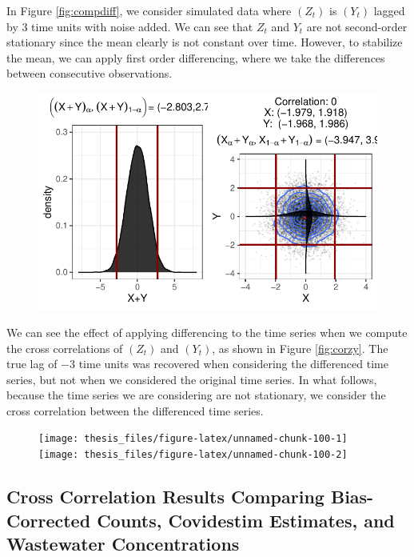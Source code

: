 \documentclass[12pt,twoside]{smiththesis}
\begin{document}
In Figure \ref{fig:compdiff}, we consider simulated data where \((Z_t)\) is \((Y_t)\) lagged by 3 time units with noise added. We can see that \(Z_t\) and \(Y_t\) are not second-order stationary since the mean clearly is not constant over time. However, to stabilize the mean, we can apply first order differencing, where we take the differences between consecutive observations.
\begin{figure}
\includegraphics[width=1\linewidth]{thesis_files/figure-latex/unnamed-chunk-99-1} \caption{\label{fig:compdiff}}\label{fig:unnamed-chunk-99}
\end{figure}
We can see the effect of applying differencing to the time series when we compute the cross correlations of \((Z_t)\) and \((Y_t)\), as shown in Figure \ref{fig:corzy}. The true lag of \(-3\) time units was recovered when considering the differenced time series, but not when we considered the original time series. In what follows, because the time series we are considering are not stationary, we consider the cross correlation between the differenced time series.
\vspace{5 cm}
\begin{figure}
\texttt{[image: thesis\_files/figure-latex/unnamed-chunk-100-1]} \texttt{[image: thesis\_files/figure-latex/unnamed-chunk-100-2]} \caption{\label{fig:corzy}}\label{fig:unnamed-chunk-100}
\end{figure}
\hypertarget{cross-correlation-results-comparing-bias-corrected-counts-covidestim-estimates-and-wastewater-concentrations}{%
\subsection{Cross Correlation Results Comparing Bias-Corrected Counts, Covidestim Estimates, and Wastewater Concentrations}\label{cross-correlation-results-comparing-bias-corrected-counts-covidestim-estimates-and-wastewater-concentrations}}
\end{document}
